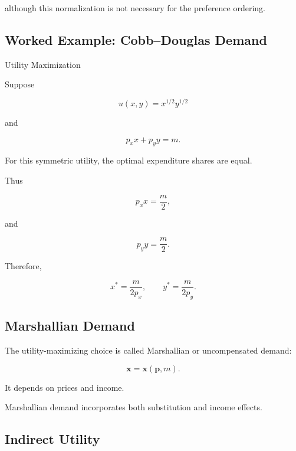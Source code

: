 although this normalization is not necessary for the preference ordering.

\subsection{Worked Example: Cobb--Douglas Demand}
\label{subsec:worked-cobb-douglas-demand}

\begin{workedexamplebox}{Utility Maximization}

Suppose

\[
u(x,y)=x^{1/2}y^{1/2}
\]

and

\[
p_xx+p_yy=m.
\]

For this symmetric utility, the optimal expenditure shares are equal.

Thus

\[
p_xx
=
\frac{m}{2},
\]

and

\[
p_yy
=
\frac{m}{2}.
\]

Therefore,

\begin{answerbox}
\[
\boxed{
x^*
=
\frac{m}{2p_x},
\qquad
y^*
=
\frac{m}{2p_y}.
}
\]
\end{answerbox}

\end{workedexamplebox}

\subsection{Marshallian Demand}
\label{subsec:marshallian-demand}

The utility-maximizing choice is called Marshallian or uncompensated demand:

\[
\boxed{
\mathbf{x}
=
\mathbf{x}(\mathbf{p},m).
}
\]

It depends on prices and income.

Marshallian demand incorporates both substitution and income effects.

\subsection{Indirect Utility}
\label{subsec:indirect-utility}

